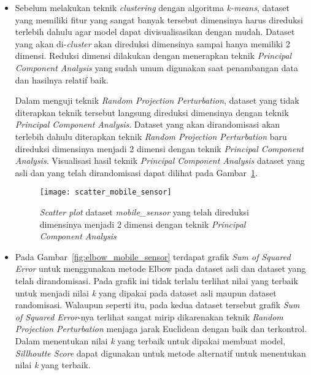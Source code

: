 \begin{itemize}
	\item Sebelum melakukan teknik \textit{clustering} dengan algoritma \textit{k-means}, dataset yang memiliki fitur yang sangat banyak tersebut dimensinya harus direduksi terlebih dahulu agar model dapat divisualisasikan dengan mudah. Dataset yang akan di-\textit{cluster} akan direduksi dimensinya sampai hanya memiliki 2 dimensi. Reduksi dimensi dilakukan dengan menerapkan teknik \textit{Principal Component Analysis} yang sudah umum digunakan saat penambangan data dan hasilnya relatif baik.
	
	Dalam menguji teknik \textit{Random Projection Perturbation}, dataset yang tidak diterapkan teknik tersebut langsung direduksi dimensinya dengan teknik \textit{Principal Component Analysis}. Dataset yang akan dirandomisasi akan terlebih dahulu diterapkan teknik \textit{Random Projection Perturbation} baru direduksi dimensinya menjadi 2 dimensi dengan teknik \textit{Principal Component Analysis}. Visualisasi hasil teknik \textit{Principal Component Analysis} dataset yang asli dan yang telah dirandomisasi dapat dilihat pada Gambar~\ref{fig:scatter_mobile_sensor}.

	\begin{figure}
		\centering
		\texttt{[image: scatter\_mobile\_sensor]}
		\caption{\textit{Scatter plot} dataset \textit{mobile\_sensor} yang telah direduksi dimensinya menjadi 2 dimensi dengan teknik \textit{Principal Component Analysis}}
		\label{fig:scatter_mobile_sensor}
	\end{figure}
	\item Pada Gambar~\ref{fig:elbow_mobile_sensor} terdapat grafik \textit{Sum of Squared Error} untuk menggunakan metode Elbow pada dataset asli dan dataset yang telah dirandomisasi. Pada grafik ini tidak terlalu terlihat nilai yang terbaik untuk menjadi nilai \textit{k} yang dipakai pada dataset asli maupun dataset randomisasi. Walaupun seperti itu, pada kedua dataset tersebut grafik \textit{Sum of Squared Error}-nya terlihat sangat mirip dikarenakan teknik \textit{Random Projection Perturbation} menjaga jarak Euclidean dengan baik dan terkontrol. Dalam menentukan nilai \textit{k} yang terbaik untuk dipakai membuat model, \textit{Sillhoutte Score} dapat digunakan untuk metode alternatif untuk menentukan nilai \textit{k} yang terbaik.


\end{itemize}
